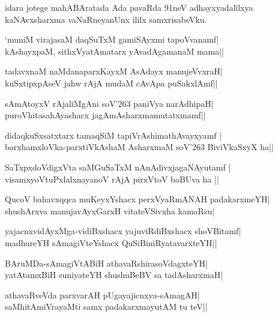 \noindent
idara jotege mahABAratada Ada pavaRda 91neV adhayxyadalilxya kaNAvxsharxma vaNaRneyanUnx ililx samxrisabeVku.

\begin{shloka}
`muniM virajasaM daqSuTxM gamiSAyxmi tapoVvanamf|\\\label{58}
kAshayxpaM, sithxVyatAmatarx yAvadAgamanaM mama||
\end{shloka}

\begin{shloka}
tadavxnaM naMdanaparxKayxM AsAdayx manujeVvxraH|\\
kuSxtipxpAseV ja{hw} rAjA mudaM cAvApa puSakxlAmf||
\end{shloka}

\begin{shloka}
sAmAtoyxV rAjaliMgAni soV\char'263 paniVya narAdhipaH|\\
puroVhitasahAyashacx jagAmAsharxmamutatxmamf||
\end{shloka}

\begin{shloka}
didaqkuSxsatxtarx tamaqSiM tapiVrAshimathAvayxyamf |\\
barxhamxloVka-parxtiVkAshaM AsharxmaM soV\char'263 BiviVkaSxyX ha||
\end{shloka}

\begin{shloka}
SaTxpxdoVdigxVta saMGuSaTxM nAnAdivxjagaNAyutamf |\\
visamxyoVtuPxlalxnayanoV rAjA pirxVtoV baBUva ha ||
\end{shloka}

\begin{shloka}
QucoV bahavxqqca muKeyxYshacx perxVyaRmANAH padakarxmeYH|\\
shushArxva manujavAyxGarxH vitateVSivxha kamaRsu|
\end{shloka}

\begin{shloka}
yajacnxvidAyxMga-vidiBxshacx yajuviRdiBxshacx shoVBitamf|\\
madhureYH sAmagiVteYshacx QuSiBiniRyatavarxteYH||
\end{shloka}

\begin{shloka}
BAruMDa-sAmagiVtABiH athavaRshirasoVdagxteYH|\\
yatAtamxBiH suniyateYH shushuBeBV sa tadAsharxmaH|
\end{shloka}

\begin{shloka}
athavaRveVda parxvarAH pUgayajicnxya-sAmagAH|\\
saMhitAmiVrayaMti samx padakarxmayutAM tu teV||
\end{shloka}

